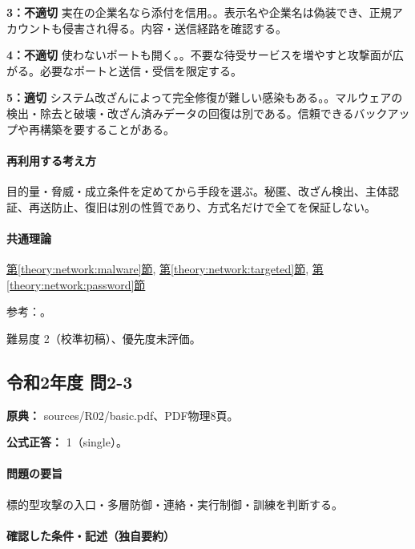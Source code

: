 \noindent\textbf{3：不適切} 実在の企業名なら添付を信用。。表示名や企業名は偽装でき、正規アカウントも侵害され得る。内容・送信経路を確認する。\par

\noindent\textbf{4：不適切} 使わないポートも開く。。不要な待受サービスを増やすと攻撃面が広がる。必要なポートと送信・受信を限定する。\par

\noindent\textbf{5：適切} システム改ざんによって完全修復が難しい感染もある。。マルウェアの検出・除去と破壊・改ざん済みデータの回復は別である。信頼できるバックアップや再構築を要することがある。\par

\paragraph{再利用する考え方} 目的量・脅威・成立条件を定めてから手段を選ぶ。秘匿、改ざん検出、主体認証、再送防止、復旧は別の性質であり、方式名だけで全てを保証しない。

\paragraph{共通理論} \hyperref[theory:network:malware]{第\ref*{theory:network:malware}節}, \hyperref[theory:network:targeted]{第\ref*{theory:network:targeted}節}, \hyperref[theory:network:password]{第\ref*{theory:network:password}節}

\par 参考：\cite{net_target2020,net_ipa_account}。

\par 難易度 2（校準初稿）、優先度未評価。

\subsection{令和2年度 問2-3}
\label{q:r02-reg-basic-2-3}

\noindent\textbf{原典：} sources/R02/basic.pdf、PDF物理8頁。

\textbf{公式正答：} 1（single）。

\paragraph{問題の要旨} 標的型攻撃の入口・多層防御・連絡・実行制御・訓練を判断する。

\paragraph{確認した条件・記述（独自要約）}\mbox{}\par

